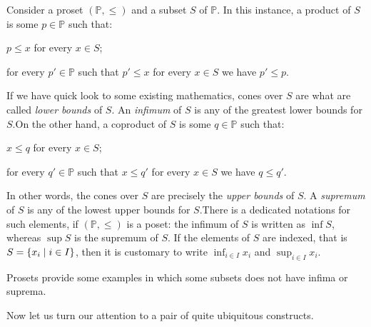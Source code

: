 \begin{example}
  Consider a proset \((\mathbb P, \le)\) and a subset \(S\) of
  \(\mathbb P\). In this instance, a product of \(S\) is some
  \(p \in \mathbb P\) such that:
  \begin{tcbenum}
  \item \(p \le x\) for every \(x \in S\);
  \item for every \(p' \in \mathbb P\) such that \(p' \le x\) for every
    \(x \in S\) we have \(p' \le p\).
  \end{tcbenum}
  If we have quick look to some existing mathematics, cones over \(S\)
  are what are called {\em lower bounds} of \(S\). An {\em infimum} of
  \(S\) is any of the greatest lower bounds for \(S\).\newline On the other
  hand, a coproduct of \(S\) is some \(q \in \mathbb P\) such that:
  \begin{tcbenum}
  \item \(x \le q\) for every \(x \in S\);
  \item for every \(q' \in \mathbb P\) such that \(x \le q'\) for every
    \(x \in S\) we have \(q \le q'\).
  \end{tcbenum}
  In other words, the cones over \(S\) are precisely the {\em upper
    bounds} of \(S\). A {\em supremum} of \(S\) is any of the lowest
  upper bounds for \(S\).\newline There is a dedicated notations for such
  elements, if \((\mathbb P, \le)\) is a poset: the infimum of \(S\) is
  written as \(\inf S\), whereas \(\sup S\) is the supremum of
  \(S\). If the elements of \(S\) are indexed, that is
  \(S = \left\{x_i \mid i \in I\right\}\), then it is customary to write
  \(\inf_{i \in I} x_i\) and \(\sup_{i \in I} x_i\).
\end{example}

\begin{exercise}
  Prosets provide some examples in which some subsets does not have
  infima or suprema.
\end{exercise}

Now let us turn our attention to a pair of quite ubiquitous
constructs.

